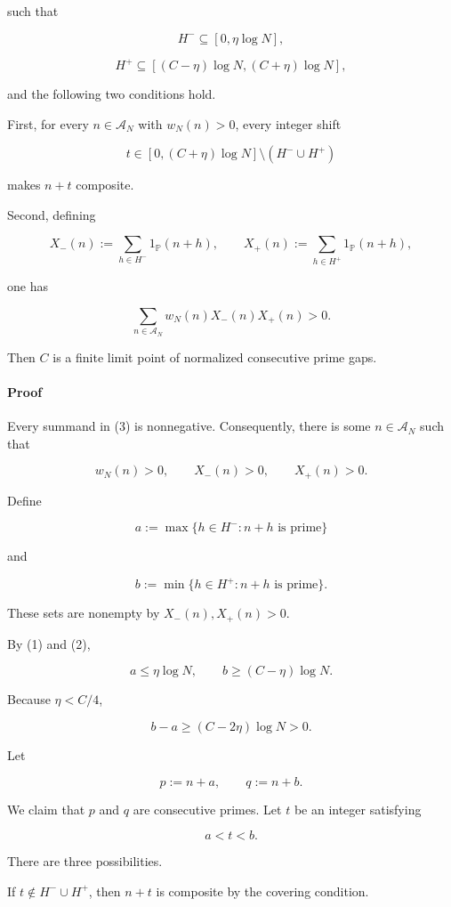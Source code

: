 such that

\[
H^-\subseteq[0,\eta\log N],
\tag{1}
\]

\[
H^+\subseteq[(C-\eta)\log N,(C+\eta)\log N],
\tag{2}
\]

and the following two conditions hold.

First, for every \(n\in\mathcal A_N\) with \(w_N(n)>0\), every integer shift

\[
t\in[0,(C+\eta)\log N]\setminus(H^-\cup H^+)
\]

makes \(n+t\) composite.

Second, defining

\[
X_-(n):=\sum_{h\in H^-}1_{\mathbb P}(n+h),
\qquad
X_+(n):=\sum_{h\in H^+}1_{\mathbb P}(n+h),
\]

one has

\[
\boxed{
\sum_{n\in\mathcal A_N}w_N(n)X_-(n)X_+(n)>0.
}
\tag{3}
\]

Then \(C\) is a finite limit point of normalized consecutive prime gaps.

\paragraph{Proof}

Every summand in (3) is nonnegative. Consequently, there is some \(n\in\mathcal A_N\) such that

\[
w_N(n)>0,\qquad X_-(n)>0,\qquad X_+(n)>0.
\]

Define

\[
a:=\max\{h\in H^-:n+h\text{ is prime}\}
\]

and

\[
b:=\min\{h\in H^+:n+h\text{ is prime}\}.
\]

These sets are nonempty by \(X_-(n),X_+(n)>0\).

By (1) and (2),

\[
a\le\eta\log N,
\qquad
b\ge(C-\eta)\log N.
\]

Because \(\eta<C/4\),

\[
b-a\ge(C-2\eta)\log N>0.
\]

Let

\[
p:=n+a,\qquad q:=n+b.
\]

We claim that \(p\) and \(q\) are consecutive primes. Let \(t\) be an integer satisfying

\[
a<t<b.
\]

There are three possibilities.

If \(t\notin H^-\cup H^+\), then \(n+t\) is composite by the covering condition.

